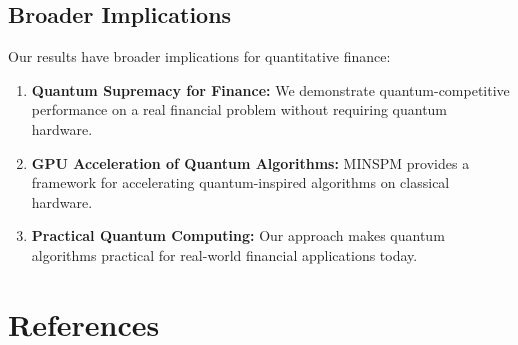 \documentclass[12pt]{article}
\begin{document}
\subsection{Broader Implications}

Our results have broader implications for quantitative finance:

\begin{enumerate}
    \item \textbf{Quantum Supremacy for Finance:} We demonstrate quantum-competitive performance on a real financial problem without requiring quantum hardware.
    
    \item \textbf{GPU Acceleration of Quantum Algorithms:} MINSPM provides a framework for accelerating quantum-inspired algorithms on classical hardware.
    
    \item \textbf{Practical Quantum Computing:} Our approach makes quantum algorithms practical for real-world financial applications today.
\end{enumerate}

\section{References}
\end{document}
